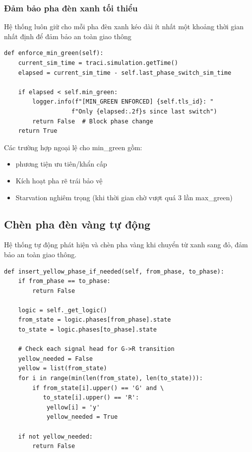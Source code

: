 \subsubsection{Đảm bảo pha đèn xanh tối thiểu}

Hệ thống luôn giữ cho mỗi pha đèn xanh kéo dài ít nhất một khoảng thời gian nhất định để đảm bảo an toàn giao thông
\begin{lstlisting}[style=py, caption={Đảm bảo pha đèn xanh tối thiểu}]
def enforce_min_green(self):
    current_sim_time = traci.simulation.getTime()
    elapsed = current_sim_time - self.last_phase_switch_sim_time
    
    if elapsed < self.min_green:
        logger.info(f"[MIN_GREEN ENFORCED] {self.tls_id}: "
                   f"Only {elapsed:.2f}s since last switch")
        return False  # Block phase change
    return True
\end{lstlisting}

Các trường hợp ngoại lệ cho min\_green gồm:
\begin{itemize}
    \item phương tiện ưu tiên/khẩn cấp
    \item Kích hoạt pha rẽ trái bảo vệ
    \item  Starvation nghiêm trọng (khi thời gian chờ vượt quá 3 lần max\_green)
\end{itemize}

\subsection{Chèn pha đèn vàng tự động}

Hệ thống tự động phát hiện và chèn pha vàng khi chuyển từ xanh sang đỏ, đảm bảo an toàn giao thông.

\begin{lstlisting}[style=py, caption={Thuật toán xác định khi nào cần pha vàng:}]
def insert_yellow_phase_if_needed(self, from_phase, to_phase):
    if from_phase == to_phase:
        return False
        
    logic = self._get_logic()
    from_state = logic.phases[from_phase].state
    to_state = logic.phases[to_phase].state
    
    # Check each signal head for G->R transition
    yellow_needed = False
    yellow = list(from_state)
    for i in range(min(len(from_state), len(to_state))):
        if from_state[i].upper() == 'G' and \
           to_state[i].upper() == 'R':
            yellow[i] = 'y'
            yellow_needed = True
    
    if not yellow_needed:
        return False
\end{lstlisting}

